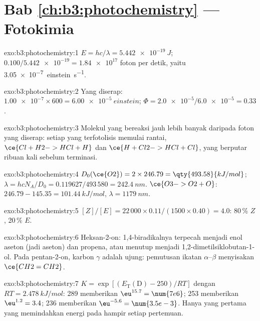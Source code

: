 \section*{Bab \ref{ch:b3:photochemistry} --- Fotokimia}

\begin{solution}{exo:b3:photochemistry:1}
$E = hc/\lambda = \qty{5.442e-19}{J}$; $0.100/\num{5.442e-19} = \num{1.84e17}$ foton per detik,
yaitu \qty{3.05e-7}{einstein.s^{-1}}.
\end{solution}

\begin{solution}{exo:b3:photochemistry:2}
Yang diserap: $\num{1.00e-7} \times 600 = \qty{6.00e-5}{einstein}$; $\Phi = \num{2.0e-5}/\num{6.0e-5} = 0.33$.
\end{solution}

\begin{solution}{exo:b3:photochemistry:3}
Molekul yang bereaksi jauh lebih banyak daripada foton yang diserap: setiap
 yang terfotolisis memulai rantai, $\ce{Cl + H2 -> HCl + H}$ dan
$\ce{H + Cl2 -> HCl + Cl}$, yang berputar ribuan kali sebelum terminasi.
\end{solution}

\begin{solution}{exo:b3:photochemistry:4}
$D_0(\ce{O2}) = 2 \times 246.79 = \qty{493.58}{kJ/mol}$; $\lambda = hcN_A/D_0 = 0.119627/493\,580 =
\qty{242.4}{nm}$. $\ce{O3 -> O2 + O}$: $246.79 - 145.35 = \qty{101.44}{kJ/mol}$, $\lambda = \qty{1179}{nm}$.
\end{solution}

\begin{solution}{exo:b3:photochemistry:5}
$[Z]/[E] = 22\,000 \times 0.11/(1500 \times 0.40) = 4.0$: 80\,\% $Z$, 20\,\% $E$.
\end{solution}

\begin{solution}{exo:b3:photochemistry:6}
Heksan-2-on: 1,4-biradikalnya terpecah menjadi enol aseton (jadi aseton) dan
propena, atau menutup menjadi 1,2-dimetilsiklobutan-1-ol. Pada pentan-2-on,
karbon $\gamma$ adalah  ujung: pemutusan ikatan $\alpha$--$\beta$
menyisakan $\ce{CH2=CH2}$.
\end{solution}

\begin{solution}{exo:b3:photochemistry:7}
$K = \exp[(E_{\mathrm T}(\mathrm D) - 250)/RT]$ dengan $RT = \qty{2.478}{kJ/mol}$: 289 memberikan
$\eu^{15.7} = \num{7e6}$; 253 memberikan $\eu^{1.2} = 3.4$; 236 memberikan
$\eu^{-5.6} = \num{3.5e-3}$. Hanya yang pertama yang memindahkan energi pada
hampir setiap pertemuan.
\end{solution}

